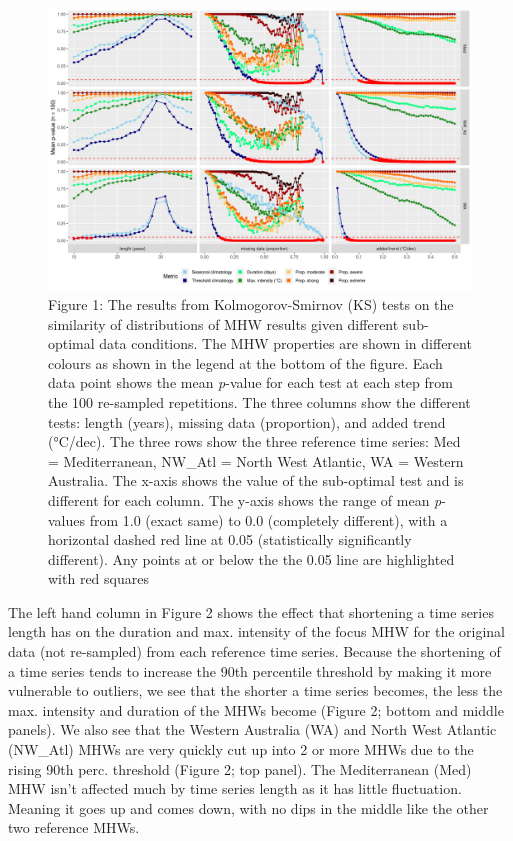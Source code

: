 \documentclass[]{article}
\begin{document}
\begin{figure}
\centering
\includegraphics{../LaTeX/fig_2.png}
\caption{Figure 1: The results from Kolmogorov-Smirnov (KS) tests on the
similarity of distributions of MHW results given different sub-optimal
data conditions. The MHW properties are shown in different colours as
shown in the legend at the bottom of the figure. Each data point shows
the mean \emph{p}-value for each test at each step from the 100
re-sampled repetitions. The three columns show the different tests:
length (years), missing data (proportion), and added trend (°C/dec). The
three rows show the three reference time series: Med = Mediterranean,
NW\_Atl = North West Atlantic, WA = Western Australia. The x-axis shows
the value of the sub-optimal test and is different for each column. The
y-axis shows the range of mean \emph{p}-values from 1.0 (exact same) to
0.0 (completely different), with a horizontal dashed red line at 0.05
(statistically significantly different). Any points at or below the the
0.05 line are highlighted with red squares}
\end{figure}

The left hand column in Figure 2 shows the effect that shortening a time
series length has on the duration and max. intensity of the focus MHW
for the original data (not re-sampled) from each reference time series.
Because the shortening of a time series tends to increase the 90th
percentile threshold by making it more vulnerable to outliers, we see
that the shorter a time series becomes, the less the max. intensity and
duration of the MHWs become (Figure 2; bottom and middle panels). We
also see that the Western Australia (WA) and North West Atlantic
(NW\_Atl) MHWs are very quickly cut up into 2 or more MHWs due to the
rising 90th perc. threshold (Figure 2; top panel). The Mediterranean
(Med) MHW isn't affected much by time series length as it has little
fluctuation. Meaning it goes up and comes down, with no dips in the
middle like the other two reference MHWs.
\end{document}
